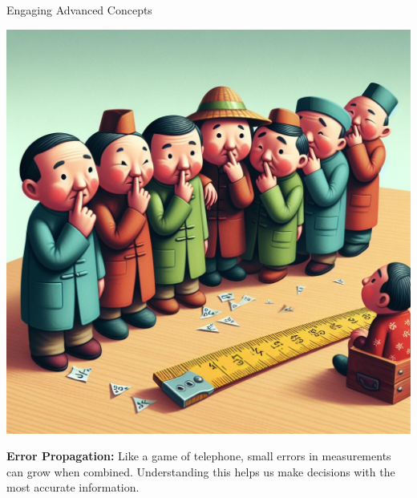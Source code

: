 \documentclass[final]{beamer}
\begin{document}
\begin{frame}[t]{}
\begin{columns}[t]
\begin{column}{.3\textwidth}
\begin{block}{Engaging Advanced Concepts}
				\vspace{1cm}

				\begin{minipage}{0.3\textwidth}
					\centering
					\includegraphics[width=\linewidth]{./images/1-2-2-WhisperGame.jpeg} 
				\end{minipage}
				\hfill
				\begin{minipage}{0.68\textwidth}
					\textbf{Error Propagation:} Like a game of telephone, small errors in measurements can grow when combined. Understanding this helps us make decisions with the most accurate information.
				\end{minipage}

				\vspace{1cm}


\end{block}
\end{column}
\end{columns}
\end{frame}
\end{document}
